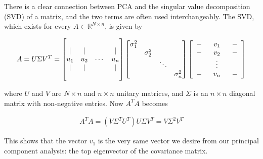 There is a clear connection between PCA and the singular value
decomposition (SVD) of a matrix, and the two terms are often used
interchangeably. The SVD, which exists for every
$A \in \mathbb{R}^{N \times n}$, is given by

\begin{align}
  A = U \Sigma V^T =   
  \begin{bmatrix}
    & & & \\ 
    | & | &  & |  \\
    u_1 & u_2 & \cdots & u_n \\
    | & | &  & |  \\
    & & &  \\
  \end{bmatrix}
  \begin{bmatrix} 
    \sigma_1^2 & & & \\
    & \sigma_2^2 & & \\
    & & \ddots & \\
    & &  & \sigma_n^2 \\
  \end{bmatrix}
  \left[ \begin{array}{ccccc}
           - & \multicolumn{3}{c}{v_1} & - \\
           - & \multicolumn{3}{c}{v_2} & - \\
             & & \vdots & & \\
           - & \multicolumn{3}{c}{v_n} & - \\
         \end{array} \right]
\end{align}

where $U$ and $V$ are $N \times n$ and $n \times n$ unitary matrices,
and $\Sigma$ is an $n \times n$ diagonal matrix with non-negative
entries. Now $A^TA$ becomes

\begin{align}
  A^T A = (V \Sigma^T U^T) U \Sigma V^T = V \Sigma^2 V^T
\end{align}

This shows that the vector $v_1$ is the very same vector we desire
from our principal component analysis: the top eigenvector of the
covariance matrix.


